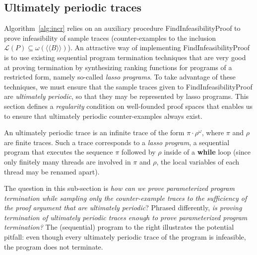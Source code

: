 \documentclass[9pt,nocopyrightspace]{sigplanconf}
\theoremstyle{definition}
\newcommand{\closure}[1]{\langle\!\langle#1\rangle\!\rangle}
\newcommand{\lang}{\mathcal{L}}
\newcommand{\itrace}{infinite trace}
\begin{document}
\subsection{Ultimately periodic traces} \label{sec:lasso-cex}







Algorithm~\ref{alg:incr} relies on an auxiliary procedure
\textsf{FindInfeasibilityProof} to prove infeasibility of sample traces
(counter-examples to the inclusion $\lang(P) \subseteq \omega(\closure{B})$).
An attractive way of implementing \textsf{FindInfeasibilityProof} is to use  existing sequential program termination techniques
\cite{cav/BradleyMS05,vmcai/PodelskiR04,conf/atva/HeizmannHLP13} that are
very good at proving termination by synthesizing ranking functions for
programs of a restricted form, namely so-called \emph{lasso programs}.  To
take advantage of these techniques, we must ensure that the sample traces
given to \textsf{FindInfeasibilityProof} are \emph{ultimately periodic}, so
that they may be represented by lasso programs.  This section defines a
\emph{regularity} condition on well-founded proof spaces that enables us to
ensure that ultimately periodic counter-examples always exist.




An ultimately periodic trace is an \itrace{} of the form $\pi \cdot \rho^\omega$,
where $\pi$ and $\rho$ are finite traces.
Such a trace corresponds to a \emph{lasso program}, a sequential program that
executes the sequence $\pi$ followed by $\rho$ inside of a \textbf{while} loop
(since only finitely many threads are involved in $\pi$ and $\rho$, the local
variables of each thread may be renamed apart).

 The question in this sub-section is \emph{how can we prove parameterized program
  termination while sampling only the counter-example traces to the sufficiency of the proof argument that are ultimately periodic}?  Phrased
differently, \emph{is proving termination of ultimately periodic traces enough
  to prove parameterized program termination?}  The (sequential) program to
the right illustrates the potential pitfall: even though every ultimately
periodic trace of the program is infeasible, the program does not terminate.
\end{document}
